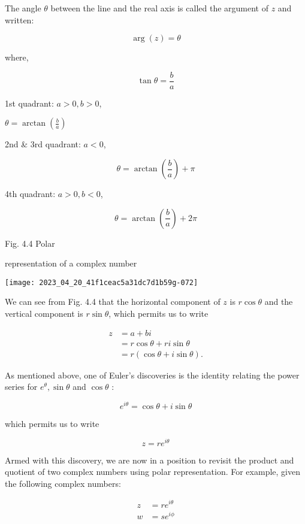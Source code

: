 The angle $\theta$ between the line and the real axis is called the argument of $z$ and written:

$$
    \arg (z)=\theta
$$

where,

$$
    \tan \theta=\frac{b}{a}
$$

1st quadrant: $a>0, b>0$,

$\theta=\arctan \left(\frac{b}{a}\right)$

2nd \& 3rd quadrant: $a<0$,

$$
    \theta=\arctan \left(\frac{b}{a}\right)+\pi
$$

4th quadrant: $a>0, b<0$,

$$
    \theta=\arctan \left(\frac{b}{a}\right)+2 \pi
$$

Fig. 4.4 Polar

representation of a complex number

\begin{center}
    \texttt{[image: 2023\_04\_20\_41f1ceac5a31dc7d1b59g-072]}
\end{center}

We can see from Fig. 4.4 that the horizontal component of $z$ is $r \cos \theta$ and the vertical component is $r \sin \theta$, which permits us to write

$$
    \begin{aligned}
        z & =a+b i                          \\
          & =r \cos \theta+r i \sin \theta  \\
          & =r(\cos \theta+i \sin \theta) .
    \end{aligned}
$$

As mentioned above, one of Euler's discoveries is the identity relating the power series for $e^{\theta}, \sin \theta$ and $\cos \theta$ :

$$
    e^{i \theta}=\cos \theta+i \sin \theta
$$

which permits us to write

$$
    z=r e^{i \theta}
$$

Armed with this discovery, we are now in a position to revisit the product and quotient of two complex numbers using polar representation. For example, given the following complex numbers:

$$
    \begin{aligned}
        z & =r e^{i \theta} \\
        w & =s e^{i \phi}
    \end{aligned}
$$

